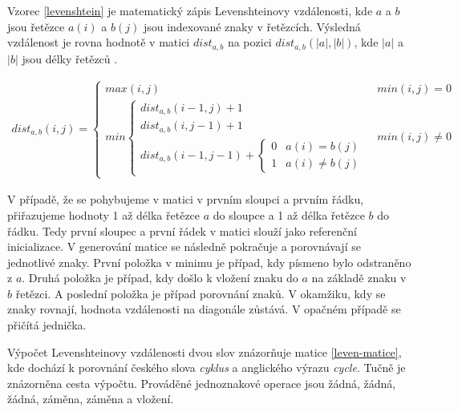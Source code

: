 \documentclass[a4paper,11pt,titlepage,fleqn]{article}
\begin{document}
            Vzorec \ref{levenshtein} je matematický zápis Levenshteinovy vzdálenosti, kde $a$ a $b$ jsou řetězce $a(i)$ a $b(j)$ jsou indexované znaky v řetězcích. Výsledná vzdálenost je rovna hodnotě v matici $dist_{a,b}$ na pozici $dist_{a,b}(|a|,|b|)$, kde $|a|$ a $|b|$ jsou délky řetězců \cite{bib:levenshtein}.

            \begin{ceqn}
            \begin{align}
                \label{levenshtein}
                dist_{a,b}(i,j) = 
                \begin{cases} 
                    max(i,j) & min(i,j) = 0\\min
                        \begin{cases}
                            dist_{a,b}(i-1,j)+1\\dist_{a,b}(i,j-1)+1\\dist_{a,b}(i-1,j-1)+
                            \begin{cases}
                                0 & a(i) = b(j)\\1 & a(i) \neq b(j)
                            \end{cases} 
                        \end{cases} & min(i,j) \neq 0 
                \end{cases}
            \end{align}
            \end{ceqn}

            V případě, že se pohybujeme v matici v prvním sloupci a prvním řádku, přiřazujeme hodnoty 1 až délka řetězce $a$ do sloupce a 1 až délka řetězce $b$ do řádku. Tedy první sloupec a první řádek v matici slouží jako referenční inicializace. V generování matice se následně pokračuje a porovnávají se jednotlivé znaky. První položka v minimu je případ, kdy písmeno bylo odstraněno z $a$. Druhá položka je případ, kdy došlo k vložení znaku do $a$ na základě znaku v $b$ řetězci. A poslední položka je případ porovnání znaků. V okamžiku, kdy se znaky rovnají, hodnota vzdálenosti na diagonále zůstává. V opačném případě se přičítá jednička.

            Výpočet Levenshteinovy vzdálenosti dvou slov znázorňuje matice \ref{leven-matice}, kde dochází k porovnání českého slova \textit{cyklus} a anglického výrazu \textit{cycle}. Tučně je znázorněna cesta výpočtu. Prováděné jednoznakové operace jsou žádná, žádná, žádná, záměna, záměna a vložení.
\end{document}
